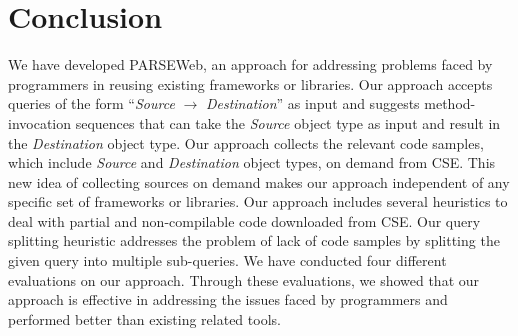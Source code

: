 \section{Conclusion}
\label{sec:conclusion}

We have developed PARSEWeb, an approach for addressing problems
faced by programmers in reusing existing frameworks or libraries.
Our approach accepts queries of the form ``\emph{Source}
$\rightarrow$ \emph{Destination}'' as input and suggests
method-invocation sequences that can take the \emph{Source} object
type as input and result in the \emph{Destination} object type. Our
approach collects the relevant code samples, which include
\emph{Source} and \emph{Destination} object types, on demand from CSE.
This new idea of collecting sources on demand makes our approach 
independent of any specific set of
frameworks or libraries. Our approach includes several heuristics to
deal with partial and non-compilable code downloaded from CSE. Our 
query splitting heuristic addresses the problem of lack of
code samples by splitting the given query into multiple sub-queries.
We have conducted four different evaluations on our
approach. Through these evaluations, we showed that our approach is effective
in addressing the issues faced by programmers and performed
better than existing related tools.
